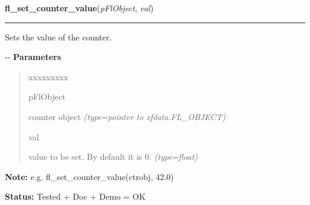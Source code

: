     \label{xformslib:flcounter:fl_set_counter_value}

    \vspace{0.5ex}

\hspace{.8\funcindent}\begin{boxedminipage}{\funcwidth}

    \raggedright \textbf{fl\_set\_counter\_value}(\textit{pFlObject}, \textit{val})

    \vspace{-1.5ex}

    \rule{\textwidth}{0.5\fboxrule}
\setlength{\parskip}{2ex}

Sets the value of the counter.

-{}-
\setlength{\parskip}{1ex}
      \textbf{Parameters}
      \vspace{-1ex}

      \begin{quote}
        \begin{Ventry}{xxxxxxxxx}

          \item[pFlObject]


counter object
            {\it (type=pointer to xfdata.FL\_OBJECT)}

          \item[val]


value to be set. By default it is 0.
            {\it (type=float)}

        \end{Ventry}

      \end{quote}

\textbf{Note:} 
e.g. fl\_set\_counter\_value(ctrobj, 42.0)


\textbf{Status:} 
Tested + Doc + Demo = OK


    \end{boxedminipage}

    \label{xformslib:flcounter:fl_set_counter_bounds}

    \vspace{0.5ex}

